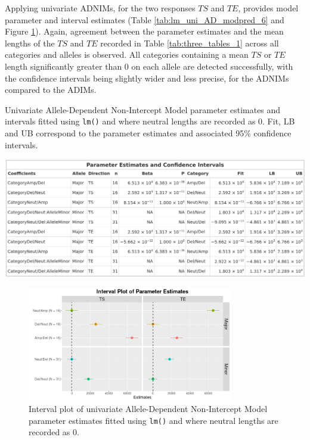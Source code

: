 Applying univariate ADNIMs, for the two responses $TS$ and $TE$, provides model parameter and interval estimates (Table \ref{tab:lm_uni_AD_modpred_6} and Figure \ref{fig:lm_uni_AD_modpred_6}). Again, agreement between the parameter estimates and the mean lengths of the $TS$ and $TE$ recorded in Table \ref{tab:three_tables_1} across all categories and alleles is observed. All categories containing a mean $TS$ or $TE$ length significantly greater than 0 on each allele are detected successfully, with the confidence intervals being slightly wider and less precise, for the ADNIMs compared to the ADIMs.

\vfill 
\begin{table}[H]
\centering
\caption[Univariate Allele-Dependent Non-Intercept Model parameter estimates and intervals fitted using \texttt{lm()}.]{Univariate Allele-Dependent Non-Intercept Model parameter estimates and intervals fitted using \texttt{lm()} and where neutral lengths are recorded as 0. Fit, LB and UB correspond to the parameter estimates and associated 95\% confidence intervals. }
      
\includegraphics[width = 1\textwidth]{../tables/Chapter_5/Univariate_lm_6_AD_Model_Pred.png}
\label{tab:lm_uni_AD_modpred_6}
\end{table}
\vspace{0.3cm}
\begin{figure}[H] 
\centering
\includegraphics[width = 0.80\textwidth]{../figures/Chapter_5/Univariate_lm_6_AD_Interval.png}
 
\caption[Interval plot of univariate Allele-Dependent Non-Intercept Model parameter estimates fitted using \texttt{lm()}.]{Interval plot of univariate Allele-Dependent Non-Intercept Model parameter estimates fitted using \texttt{lm()} and where neutral lengths are recorded as 0.}
\label{fig:lm_uni_AD_modpred_6}
\end{figure}
\vfill 
\clearpage 

